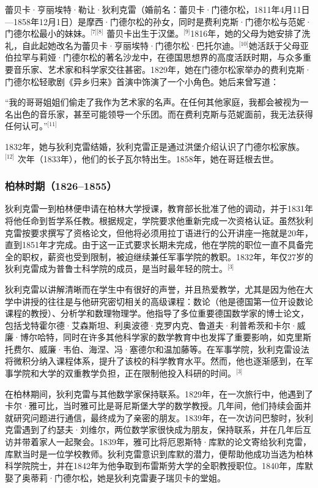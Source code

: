 蕾贝卡·亨丽埃特·勒让·狄利克雷（婚前名：蕾贝卡·门德尔松，1811年4月11日—1858年12月1日）是摩西·门德尔松的孙女，同时是费利克斯·门德尔松与范妮·门德尔松最小的妹妹。\(^\text{[7][8]}\) 蕾贝卡出生于汉堡。\(^\text{[9]}\)1816年，她的父母为她安排了洗礼，自此起她改名为蕾贝卡·亨丽埃特·门德尔松·巴托尔迪。\(^\text{[10]}\)她活跃于父母亚伯拉罕与莉娅·门德尔松的著名沙龙中，在德国思想界的高度活跃时期，与众多重要音乐家、艺术家和科学家交往甚密。1829年，她在门德尔松家举办的费利克斯·门德尔松轻歌剧《异乡归来》首演中饰演了一个小角色。她后来曾写道：

“我的哥哥姐姐们偷走了我作为艺术家的名声。在任何其他家庭，我都会被视为一名出色的音乐家，甚至可能领导一个乐团。而在费利克斯与范妮面前，我无法获得任何认可。”\(^\text{[11]}\)

1832年，她与狄利克雷结婚，狄利克雷正是通过洪堡介绍认识了门德尔松家族。\(^\text{[12]}\) 次年（1833年），他们的长子瓦尔特出生。1858年，她在哥廷根去世。
\subsubsection{柏林时期（1826–1855）}
狄利克雷一到柏林便申请在柏林大学授课，教育部长批准了他的调动，并于1831年将他任命到哲学系任教。根据规定，学院要求他重新完成一次资格认证。虽然狄利克雷按要求撰写了资格论文，但他将必须用拉丁语进行的公开讲座一拖就是20年，直到1851年才完成。由于这一正式要求长期未完成，他在学院的职位一直不具备完全的职权，薪资也受到限制，被迫继续兼任军事学院的教职。1832年，年仅27岁的狄利克雷成为普鲁士科学院的成员，是当时最年轻的院士。\(^\text{[3]}\)

狄利克雷以讲解清晰而在学生中有很好的声誉，并且热爱教学，尤其是因为他在大学中讲授的往往是与他研究密切相关的高级课程：数论（他是德国第一位开设数论课程的教授）、分析学和数理物理学。他指导了多位重要德国数学家的博士论文，包括戈特霍尔德·艾森斯坦、利奥波德·克罗内克、鲁道夫·利普希茨和卡尔·威廉·博尔哈特，同时在许多其他科学家的数学教育中也发挥了重要影响，如克里斯托费尔、威廉·韦伯、海涅、冯·塞德尔和温加藤等。在军事学院，狄利克雷设法将微积分纳入课程体系，提升了该校的科学教育水平。然而，他也逐渐感到，在军事学院和大学的双重教学负担，正在限制他投入科研的时间。\(^\text{[3]}\)

在柏林期间，狄利克雷与其他数学家保持联系。1829年，在一次旅行中，他遇到了卡尔·雅可比，当时雅可比是哥尼斯堡大学的数学教授。几年间，他们持续会面并就研究问题进行通信，最终成为了亲密的朋友。1839年，在一次访问巴黎时，狄利克雷遇到了约瑟夫·刘维尔，两位数学家很快成为朋友，保持联系，并在几年后互访并带着家人一起聚会。1839年，雅可比将厄恩斯特·库默的论文寄给狄利克雷，库默当时是一位学校教师。狄利克雷意识到库默的潜力，便帮助他成功当选为柏林科学院院士，并在1842年为他争取到布雷斯劳大学的全职教授职位。1840年，库默娶了奥蒂莉·门德尔松，她是狄利克雷妻子瑞贝卡的堂姐。

